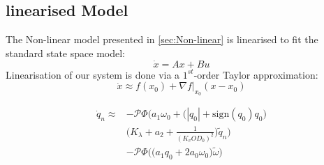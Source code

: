 \subsection{linearised Model}
The Non-linear model presented in \cref{sec:Non-linear} is linearised to fit the standard state space model:
\begin{equation*}
	\dot{x}=Ax+Bu
\end{equation*}
Linearisation of our system is done via a $ 1^{st} $-order Taylor approximation: 
\begin{equation}\label{eq:TaylorSeries}
	\dot{x} \approx f(x_0) + \nabla f\bigg\rvert_{x_0} (x-x_0)
\end{equation}

\begin{equation}\label{eq:LinearisedModelWithTank}
	\begin{split}
	\dot{q}_n \approx &-\mathcal{P}\Phi\Bigg(a_1\omega_0 + \Big(|q_0|+\text{sign}(q_0)q_0\Big)\\
	&\Bigg(K_\lambda + a_2 + \frac{1}{(K_v OD_0)^2}\Bigg) \tilde{q}_n \Bigg)\\
	&- \mathcal{P}\Phi\Bigg(\Big(a_1 q_0 + 2a_0\omega_0\Big) \tilde{\omega}\Bigg)
	\end{split}
\end{equation}